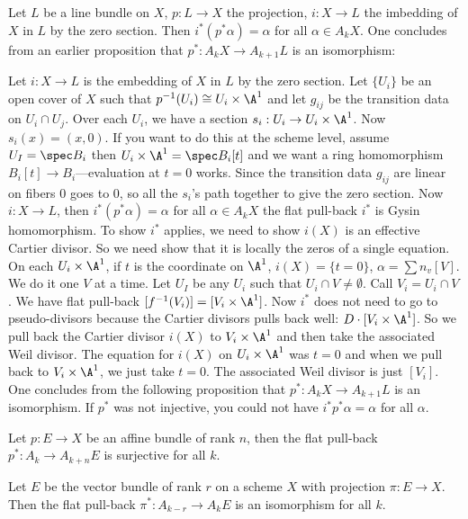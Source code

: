\begin{ex}
Let $L$ be a line bundle on $X$, $p: L \to X$ the projection, $i: X \to L$ the imbedding of $X$ in $L$ by the zero section. Then $i^*(p^*\alpha)=\alpha$ for all $\alpha \in A_kX$. One concludes from an earlier proposition that $p^*: A_k X \to A_{k+1}L$ is an isomorphism:

Let $i: X \to L$ is the embedding of $X$ in $L$ by the zero section. Let $\{U_i\}$ be an open cover of $X$ such that $p^{-1}(U_i) \cong U_i \times \A^1$ and let $g_{ij}$ be the transition data on $U_i \cap U_j$. Over each $U_i$, we have a section $s_i: U_i \to U_i \times \A^1$. Now $s_i(x)=(x,0)$. If you want to do this at the scheme level, assume $U_I=\spec B_i$ then $U_i \times \A^1=\spec B_i[t]$ and we want a ring homomorphism $B_i[t] \to B_i$---evaluation at $t=0$ works. Since the transition data $g_{ij}$ are linear on fibers 0 goes to 0, so all the $s_i$'s path together to give the zero section. Now $i: X \to L$, then $i^*(p^*\alpha)=\alpha$ for all $\alpha \in A_k X$ the flat pull-back $i^*$ is Gysin homomorphism. To show $i^*$ applies, we need to show $i(X)$ is an effective Cartier divisor. So we need show that it is locally the zeros of a single equation. On each $U_i \times \A^1$, if $t$ is the coordinate on $\A^1$, $i(X)=\{t=0\}$, $\alpha= \sum n_v[V]$. We do it one $V$ at a time. Let $U_I$ be any $U_i$ such that $U_i \cap V \neq \emptyset$. Call $V_i=U_i \cap V$. We have flat pull-back $[f^{-1}(V_i)]=[V_i \times \A^1]$. Now $i^*$ does not need to go to pseudo-divisors because the Cartier divisors pulls back well: $D \cdot [V_i \times \A^1]$. So we pull back the Cartier divisor $i(X)$ to $V_i \times \A^1$ and then take the associated Weil divisor. The equation for $i(X)$ on $U_i \times \A^1$ was $t=0$ and when we pull back to $V_i \times \A^1$, we just take $t=0$. The associated Weil divisor is just $[V_i]$. One concludes from the following proposition that $p^*: A_kX \to A_{k+1}L$ is an isomorphism. If $p^*$ was not injective, you could not have $i^*p^*\alpha=\alpha$ for all $\alpha$.
\end{ex}


\begin{prop}
Let $p: E \to X$ be an affine bundle of rank $n$, then the flat pull-back $p^*: A_k \to A_{k+n} E$ is surjective for all $k$.
\end{prop}


\begin{thmm}
Let $E$ be the vector bundle of rank $r$ on a scheme $X$ with projection $\pi: E \to X$. Then the flat pull-back $\pi^*: A_{k-r} \to A_k E$ is an isomorphism for all $k$.
\end{thmm}





